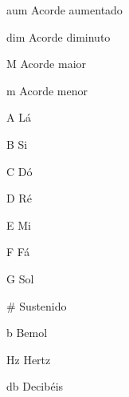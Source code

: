 \begin{siglas}
  \item[aum] Acorde aumentado
  \item[dim] Acorde diminuto
  \item[M] Acorde maior
  \item[m] Acorde menor
  \item[A] Lá
  \item[B] Si
  \item[C] Dó
  \item[D] Ré
  \item[E] Mi
  \item[F] Fá
  \item[G] Sol
  \item[\#] Sustenido
  \item[b] Bemol
  \item[Hz] Hertz
  \item[db] Decibéis
\end{siglas}
